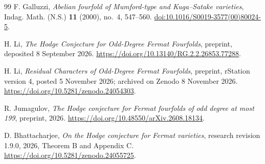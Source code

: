 \documentclass[11pt,reqno]{amsart}
\numberwithin{equation}{section}
\theoremstyle{plain}
\theoremstyle{definition}
\begin{document}
\begin{thebibliography}{99}
F. Galluzzi, \emph{Abelian fourfold of Mumford-type and Kuga--Satake varieties},
Indag. Math. (N.S.) \textbf{11} (2000), no.~4, 547--560.
\href{https://doi.org/10.1016/S0019-3577(00)80024-5}{doi:10.1016/S0019-3577(00)80024-5}.


H. Li, \emph{The Hodge Conjecture for Odd-Degree Fermat Fourfolds},
preprint, deposited 8 September 2026.
\url{https://doi.org/10.13140/RG.2.2.26853.77288}.

H. Li, \emph{Residual Characters of Odd-Degree Fermat Fourfolds},
preprint, rStation version 4, posted 5 November 2026; archived on
Zenodo 8 November 2026.
\url{https://doi.org/10.5281/zenodo.24054303}.

R. Jumagulov, \emph{The Hodge conjecture for Fermat fourfolds of odd
degree at most 199}, preprint, 2026.
\url{https://doi.org/10.48550/arXiv.2608.18134}.

D. Bhattacharjee, \emph{On the Hodge conjecture for Fermat varieties},
research revision 1.9.0, 2026, Theorem B and Appendix C.
\url{https://doi.org/10.5281/zenodo.24055725}.

\end{thebibliography}
\end{document}
